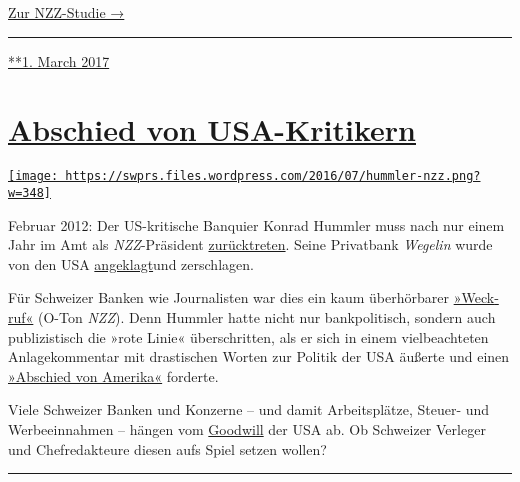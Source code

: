 \href{https://swprs.org/die-nzz-studie/}{Zur NZZ-Studie →}

\begin{center}\rule{0.5\linewidth}{\linethickness}\end{center}

\href{https://swprs.org/2017/03/01/die-nzz-studie/}{**1. March 2017}

\hypertarget{abschied-von-usa-kritikern}{%
\section{\texorpdfstring{\href{https://swprs.org/2017/03/01/abschied-von-usa-kritikern/}{Abschied
von
USA-Kritikern}}{Abschied von USA-Kritikern}}\label{abschied-von-usa-kritikern}}

\href{https://swprs.org/2017/03/01/abschied-von-usa-kritikern/}{\texttt{[image: https://swprs.files.wordpress.com/2016/07/hummler-nzz.png?w=348]}}

Februar 2012: Der US-kritische Banquier Konrad Hummler muss nach nur
einem Jahr im Amt als \emph{NZZ}-Präsi­dent
\href{https://www.tagesanzeiger.ch/wirtschaft/unternehmen-und-konjunktur/Konrad-Hummler-gibt-NZZVRPraesidium-ab/story/25627682}{zurück­treten}.
Seine Privatbank \emph{Wegelin} wurde von den USA
\href{https://www.tagesanzeiger.ch/wirtschaft/unternehmen-und-konjunktur/USA-erhoehen-mit-WegelinKlage-den-Druck/story/25658973}{an­ge­klagt}und
zerschlagen.

Für Schweizer Banken wie Journalisten war dies ein kaum über­hör­ba­rer
\href{http://www.nzz.ch/ein-weckruf-fuer-die-schweiz-1.14608280}{»Weck­ruf«}
(O-Ton \emph{NZZ}). Denn Hummler hatte nicht nur bank­politisch, sondern
auch publi­zistisch die »rote Linie« über­schritten, als er sich in
einem viel­beachteten An­la­ge­kom­men­tar mit dras­ti­schen Worten zur
Po­li­tik der USA äußerte und einen
\href{https://swprs.files.wordpress.com/2016/03/usa_wegelin_kommentar_2009.pdf}{»Abschied
von Amerika«} forderte.

Viele Schwei­zer Banken und Konzerne -- und da­mit Ar­beits­plätze,
Steuer- und Werbe­ein­nah­men -- hän­gen vom
\href{http://www.finews.ch/news/finanzplatz/21359-us-steuerstreit-kategorie-2-kategorie-1-lombard-odier-julius-b\%C3\%A4r-department-of-justice}{Good­will}
der USA ab. Ob Schweizer Ver­le­ger und Chef­re­dak­teure diesen aufs
Spiel setzen wollen?

\begin{center}\rule{0.5\linewidth}{\linethickness}\end{center}

